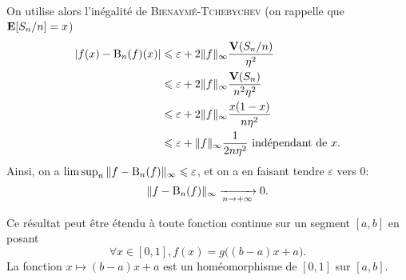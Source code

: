 \begin{preuve}
\begin{align*}
    \end{align*}
    On utilise alors l'inégalité de \textsc{Bienaymé}-\textsc{Tchebychev} \note (on rappelle que $\mathbf{E}[S_n/n] = x$)
    \begin{align*}
        |f(x) - \mathrm{B}_n(f)(x)| &\leqslant \varepsilon + 2 \Vert f \Vert_\infty \frac{\mathbf{V}(S_n/n)}{\eta^2} \\
        &\leqslant \varepsilon + 2 \Vert f \Vert_\infty \frac{\mathbf{V}(S_n)}{n^2 \eta^2} \\
        &\leqslant \varepsilon + 2 \Vert f \Vert_\infty \frac{x(1-x)}{n \eta^2} \\
        &\leqslant \varepsilon + \Vert f \Vert_\infty \frac{1}{2 n \eta^2} \text{ indépendant de $x$}.
    \end{align*}
    Ainsi, on a $\lim \sup_n \Vert f - \mathrm{B}_n(f) \Vert_\infty \leqslant \varepsilon$, et on a en faisant tendre $\varepsilon$ vers $0$:
    $$\Vert f - \mathrm{B}_n(f) \Vert_\infty \xrightarrow[n \to + \infty]{} 0.$$
\end{preuve}

\begin{remarque}
    Ce résultat peut être étendu à toute fonction continue sur un segment $[a, b]$ en posant
    $$\forall x \in [0, 1], f(x) = g \big( (b-a)x + a \big).$$
    La fonction $x \mapsto (b-a)x + a$ est un homéomorphisme de $[0, 1]$ sur $[a, b]$.
\end{remarque}